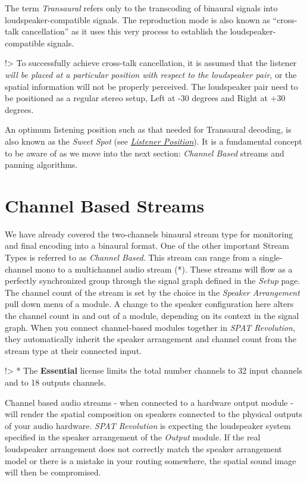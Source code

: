 \documentclass[
  letterpaper,
  DIV=11,
  numbers=noendperiod]{scrreport}
\begin{document}
The term \emph{Transaural} refers only to the transcoding of binaural
signals into loudspeaker-compatible signals. The reproduction mode is
also known as ``cross-talk cancellation'' as it uses this very process
to establish the loudspeaker-compatible signals.

!\textgreater{} To successfully achieve cross-talk cancellation, it is
assumed that the listener \emph{will be placed at a particular position
with respect to the loudspeaker pair}, or the spatial information will
not be properly perceived. The loudspeaker pair need to be positioned as
a regular stereo setup, Left at -30 degrees and Right at +30 degrees.

An optimum listening position such as that needed for Transaural
decoding, is also known as the \emph{Sweet Spot} (see
\href{Spatialisation_Technology_Listener_Position.md}{\emph{Listener
Position}}). It is a fundamental concept to be aware of as we move into
the next section: \emph{Channel Based} streams and panning algorithms.

\hypertarget{channel-based-streams}{%
\chapter{Channel Based Streams}\label{channel-based-streams}}

We have already covered the two-channels binaural stream type for
monitoring and final encoding into a binaural format. One of the other
important Stream Types is referred to as \emph{Channel Based}. This
stream can range from a single-channel mono to a multichannel audio
stream (*). These streams will flow as a perfectly synchronized group
through the signal graph defined in the \emph{Setup} page. The channel
count of the stream is set by the choice in the \emph{Speaker
Arrangement} pull down menu of a module. A change to the speaker
configuration here alters the channel count in and out of a module,
depending on its context in the signal graph. When you connect
channel-based modules together in \emph{SPAT Revolution}, they
automatically inherit the speaker arrangement and channel count from the
stream type at their connected input.

!\textgreater{} * The \textbf{Essential} license limits the total number
channels to 32 input channels and to 18 outputs channels.

Channel based audio streams - when connected to a hardware output module
- will render the spatial composition on speakers connected to the
physical outputs of your audio hardware. \emph{SPAT Revolution} is
expecting the loudspeaker system specified in the speaker arrangement of
the \emph{Output} module. If the real loudspeaker arrangement does not
correctly match the speaker arrangement model or there is a mistake in
your routing somewhere, the spatial sound image will then be
compromised.
\end{document}
